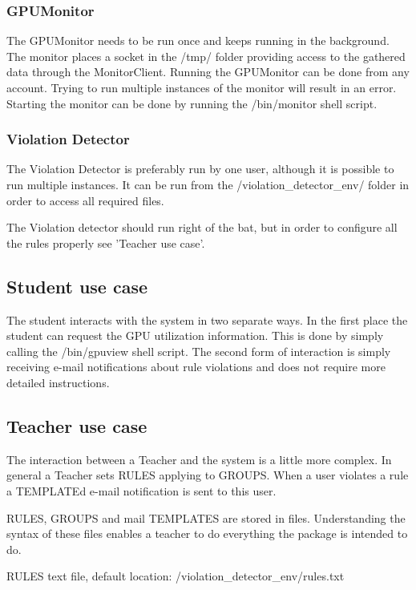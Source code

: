 \documentclass[10pt]{article}
\begin{document}
\subsubsection{GPUMonitor}
The GPUMonitor needs to be run once and keeps running in the background.
The monitor places a socket in the /tmp/ folder providing access to the
gathered data through the MonitorClient. Running the GPUMonitor can be 
done from any account. Trying to run multiple instances of the monitor 
will result in an error. Starting the monitor can be done by running the
/bin/monitor shell script.

\subsubsection{Violation Detector}
The Violation Detector is preferably run by one user, although it is 
possible to run multiple instances. It can be run from the 
/violation\_detector\_env/ folder in order to access all required files.

The Violation detector should run right of the bat, but in order
to configure all the rules properly see 'Teacher use case'.
    
\subsection{Student use case}
        The student interacts with the system in two separate ways. In the
        first place the student can request the GPU utilization information.
        This is done by simply calling the /bin/gpuview shell script.
        The second form of interaction is simply receiving e-mail notifications
        about rule violations and does not require more detailed instructions. 

\subsection{Teacher use case}
The interaction between a Teacher and the system is a little more
complex. In general a Teacher sets RULES applying to GROUPS. When
a user violates a rule a TEMPLATEd e-mail notification is sent to 
this user. 

RULES, GROUPS and mail TEMPLATES are stored in files. Understanding
the syntax of these files enables a teacher to do everything the
package is intended to do.

RULES
text file, default location: /violation\_detector\_env/rules.txt
\end{document}
